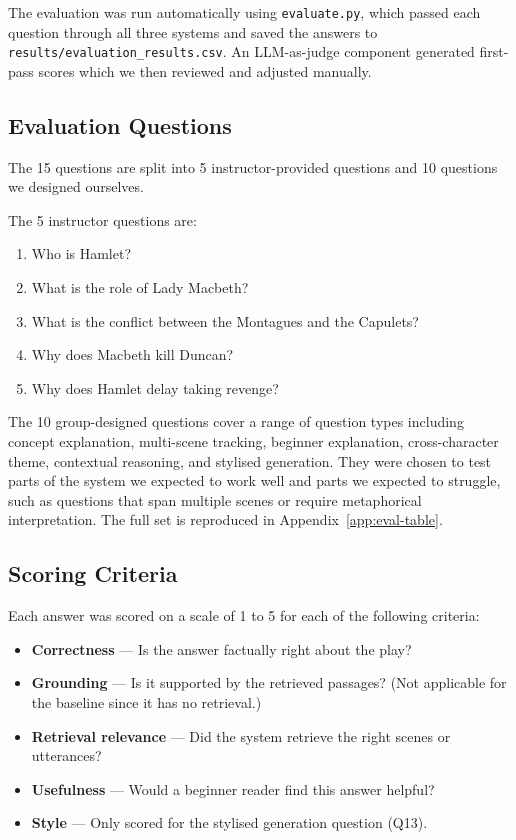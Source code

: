 \documentclass[10pt,conference]{IEEEtran}
\begin{document}
The evaluation was run automatically using \texttt{evaluate.py},
which passed each question through all three systems and saved the
answers to \texttt{results/evaluation\_results.csv}. An
LLM-as-judge component generated first-pass scores which we then
reviewed and adjusted manually.

\subsection{Evaluation Questions}

The 15 questions are split into 5 instructor-provided questions and
10 questions we designed ourselves.

The 5 instructor questions are:
\begin{enumerate}
    \item Who is Hamlet?
    \item What is the role of Lady Macbeth?
    \item What is the conflict between the Montagues and the Capulets?
    \item Why does Macbeth kill Duncan?
    \item Why does Hamlet delay taking revenge?
\end{enumerate}

The 10 group-designed questions cover a range of question types
including concept explanation, multi-scene tracking, beginner
explanation, cross-character theme, contextual reasoning, and
stylised generation. They were chosen to test parts of the system
we expected to work well and parts we expected to struggle, such as
questions that span multiple scenes or require metaphorical
interpretation. The full set is reproduced in
Appendix~\ref{app:eval-table}.

\subsection{Scoring Criteria}

Each answer was scored on a scale of 1 to 5 for each of the
following criteria:

\begin{itemize}
    \item \textbf{Correctness} --- Is the answer factually right
    about the play?
    \item \textbf{Grounding} --- Is it supported by the retrieved
    passages? (Not applicable for the baseline since it has no
    retrieval.)
    \item \textbf{Retrieval relevance} --- Did the system retrieve
    the right scenes or utterances?
    \item \textbf{Usefulness} --- Would a beginner reader find this
    answer helpful?
    \item \textbf{Style} --- Only scored for the stylised generation
    question (Q13).
\end{itemize}
\end{document}
